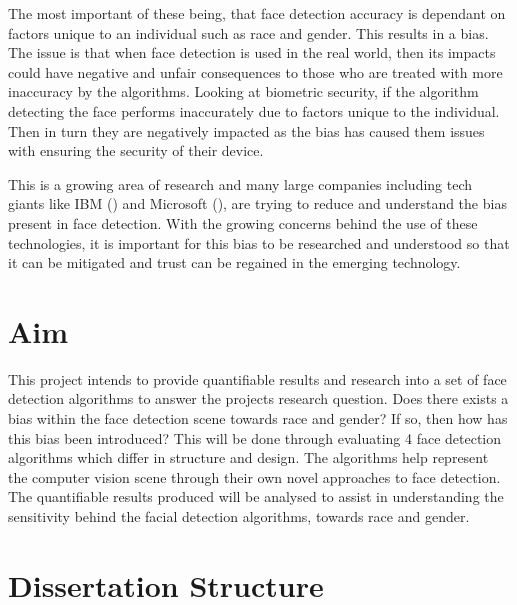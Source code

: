 \documentclass{l4proj}
\begin{document}
The most important of these being, that face detection accuracy is dependant on factors unique to an individual such as race and gender. This results in a bias. The issue is that when face detection is used in the real world, then its impacts could have negative and unfair consequences to those who are treated with more inaccuracy by the algorithms. Looking at biometric security, if the algorithm detecting the face performs inaccurately due to factors unique to the individual. Then in turn they are negatively impacted as the bias has caused them issues with ensuring the security of their device. 

This is a growing area of research and many large companies including tech giants like IBM (\cite{ibm}) and Microsoft (\cite{microsoft}), are trying to reduce and understand the bias present in face detection. With the growing concerns behind the use of these technologies, it is important for this bias to be researched and understood so that it can be mitigated and trust can be regained in the emerging technology.

\section{Aim}
\label{aims}

This project intends to provide quantifiable results and research into a set of face detection algorithms to answer the projects research question. Does there exists a bias within the face detection scene towards race and gender? If so, then how has this bias been introduced? This will be done through evaluating 4 face detection algorithms which differ in structure and design. The algorithms help represent the computer vision scene through their own novel approaches to face detection. The quantifiable results produced will be analysed to assist in understanding the sensitivity behind the facial detection algorithms, towards race and gender.


\section{Dissertation Structure}
\label{structure}
\end{document}
